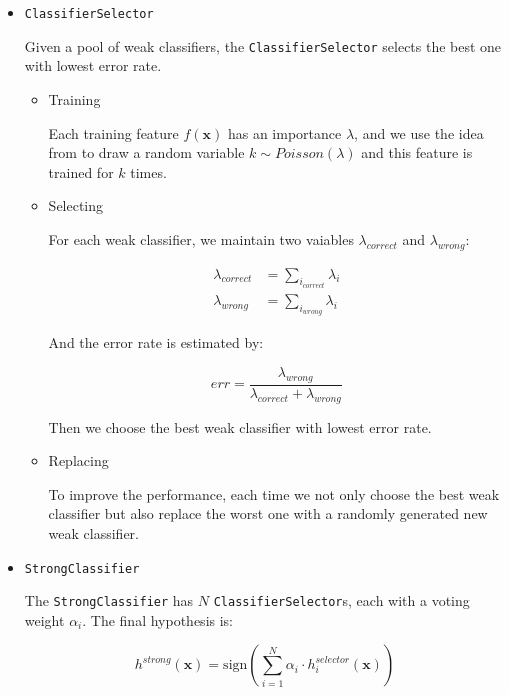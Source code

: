 \documentclass[a4paper]{article}
\begin{document}
\begin{enumerate}
\begin{itemize}
\begin{itemize}
\item \lstinline{ClassifierSelector}

Given a pool of weak classifiers, the \lstinline{ClassifierSelector} selects the best one with lowest error rate.

\begin{itemize}

\item Training

Each training feature $f(\mathbf{x})$ has an importance $\lambda$, and we use the idea from \cite{Oza01onlinebagging} to draw a random variable $k\sim Poisson(\lambda)$ and this feature is trained for $k$ times.

\item Selecting

For each weak classifier, we maintain two vaiables $\lambda_{correct}$ and $\lambda_{wrong}$:

\begin{subequations}
\begin{align}
\lambda_{correct}&=\sum_{i_{correct}}\lambda_{i}\\
\lambda_{wrong}&=\sum_{i_{wrong}}\lambda_{i}
\end{align}
\end{subequations}

And the error rate is estimated by:

\begin{equation}
err=\frac{\lambda_{wrong}}{\lambda_{correct}+\lambda_{wrong}}
\end{equation}

Then we choose the best weak classifier with lowest error rate.

\item Replacing

To improve the performance, each time we not only choose the best weak classifier but also replace the worst one with a randomly generated new weak classifier.

\end{itemize}

\item \lstinline{StrongClassifier}

The \lstinline{StrongClassifier} has $N$ \lstinline{ClassifierSelector}s, each with a voting weight $\alpha_i$. The final hypothesis is:

\begin{equation}
h^{strong}(\mathbf{x})=\mathrm{sign}(\sum_{i=1}^{N}\alpha_{i}\cdot h^{selector}_{i}(\mathbf{x}))
\end{equation} 


\end{itemize}
\end{itemize}
\end{enumerate}
\end{document}
